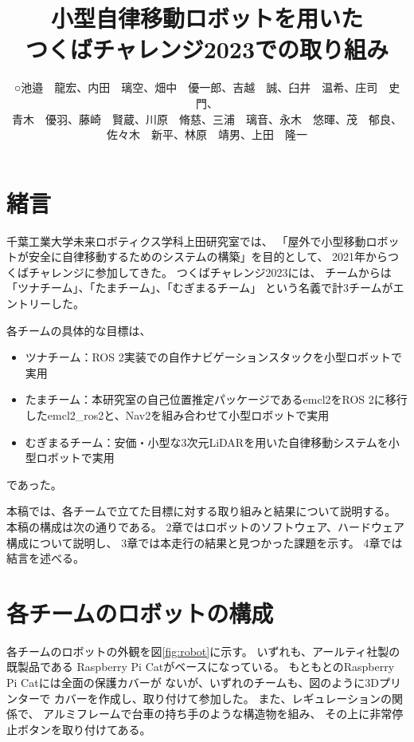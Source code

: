 \documentclass[twocolumn,9pt]{jsproceedings}
\title{小型自律移動ロボットを用いた\\つくばチャレンジ2023での取り組み}
\author{○池邉　龍宏\authorrefmark{2}、内田　璃空\authorrefmark{2}、畑中　優一郎\authorrefmark{2}、吉越　誠\authorrefmark{1}、臼井　温希\authorrefmark{1}、庄司　史門\authorrefmark{1}、
\\青木　優羽\authorrefmark{1}、藤崎　賢蔵\authorrefmark{1}、川原　脩慈\authorrefmark{1}、三浦　璃音\authorrefmark{1}、永木　悠暉\authorrefmark{1}、茂　郁良\authorrefmark{1}、
\\佐々木　新平\authorrefmark{1}、林原　靖男\authorrefmark{1}、上田　隆一\authorrefmark{1}}
\affiliation{千葉工業大学 未来ロボティクス学科 ツナチーム/たまチーム/むぎまるチーム}
\begin{document}
\maketitle


\section{緒言}

千葉工業大学未来ロボティクス学科上田研究室では、
「屋外で小型移動ロボットが安全に自律移動するためのシステムの構築」を目的として、
2021年からつくばチャレンジに参加してきた。
つくばチャレンジ2023には、
チームからは「ツナチーム」、「たまチーム」、「むぎまるチーム」
という名義で計3チームがエントリーした。




各チームの具体的な目標は、
\begin{itemize}
  \item ツナチーム：ROS 2実装での自作ナビゲーションスタックを小型ロボットで実用
  \item たまチーム：本研究室の自己位置推定パッケージであるemcl2\cite{emcl2}をROS 2に移行したemcl2\_ros2\cite{emcl2_ros2}と、Nav2を組み合わせて小型ロボットで実用
  \item むぎまるチーム：安価・小型な3次元LiDARを用いた自律移動システムを小型ロボットで実用
\end{itemize}
であった。


本稿では、各チームで立てた目標に対する取り組みと結果について説明する。
本稿の構成は次の通りである。
2章ではロボットのソフトウェア、ハードウェア構成について説明し、
3章では本走行の結果と見つかった課題を示す。
4章では結言を述べる。

\section{各チームのロボットの構成}

各チームのロボットの外観を図\ref{fig:robot}に示す。
いずれも、アールティ社製の既製品である
Raspberry Pi Cat\cite{RTshop}がベースになっている。
もともとのRaspberry Pi Catには全面の保護カバーが
ないが、いずれのチームも、図のように3Dプリンターで
カバーを作成し、取り付けて参加した。
また、レギュレーションの関係で、
アルミフレームで台車の持ち手のような構造物を組み、
その上に非常停止ボタンを取り付けてある。
\end{document}
